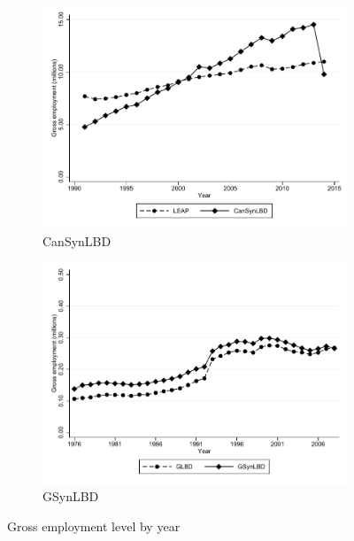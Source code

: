 \begin{figure}
\begin{subfigure}[h]{0.48\linewidth}
\includegraphics[width=\linewidth]{graphs/Gross_employment_level_by_year_private_bw.pdf}
\caption{CanSynLBD}
\end{subfigure}
\hfill
\begin{subfigure}[h]{0.48\linewidth}
\includegraphics[width=\linewidth]{graphs/Gross_employment_level_by_year_bw_GsynLBD.pdf}
\caption{GSynLBD}
\end{subfigure}%
\caption{Gross employment level by year}
\end{figure}




